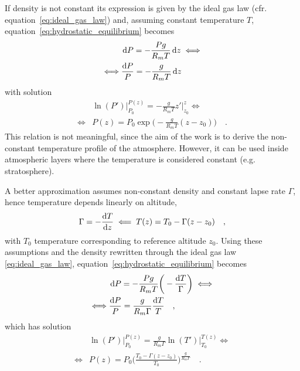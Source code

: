 \documentclass[a4paper,10pt,twocolumn,\classoptions]{article}
\begin{document}
If density is not constant its expression is given by the ideal gas law (cfr. equation~\eqref{eq:ideal_gas_law}) and, assuming constant temperature $T$, equation~\eqref{eq:hydrostatic_equilibrium} becomes
\begin{equation}
  \label{eq:hydrostatic_equilibrium_ideal_gas_law_constant_temperature}
  \begin{split}
    & \odif{P} = - \frac{P g}{R_m T} \odif{z} \iff \\
    \iff & \frac{\odif{P}}{P} = - \frac{g}{R_m T} \odif{z}
  \end{split}
\end{equation}
with solution
\begin{equation}
  \label{eq:pressure_constant_temperature}
  \begin{split}
    & \ln(P') \bigg|_{P_0}^{P(z)} = - \frac{g}{R_m T} z' \bigg|_{z_0}^{z} \iff \\
    \iff & P(z) = P_0 \exp{\bigg( - \frac{g}{R_m T} (z - z_0) \bigg)}
    \quad .
  \end{split}
\end{equation}
This relation is not meaningful, since the aim of the work is to derive the non-constant temperature profile of the atmosphere. However, it can be used inside atmospheric layers where the temperature is considered constant (e.g. stratosphere).

A better approximation assumes non-constant density and constant lapse rate $\Gamma$, hence temperature depends linearly on altitude,
\begin{equation}
  \label{eq:constant_lapse_rate}
  \Gamma = - \frac{\odif{T}}{\odif{z}} \impliedby T(z) = T_0 - \Gamma (z - z_0)
  \quad ,
\end{equation}
with $T_0$ temperature corresponding to reference altitude $z_0$. Using these assumptions and the density rewritten through the ideal gas law \eqref{eq:ideal_gas_law}, equation~\eqref{eq:hydrostatic_equilibrium} becomes
\begin{equation}
  \label{eq:hydrostatic_equilibrium_ideal_gas_law_constant_lapse_rate}
  \begin{split}
    & \odif{P} = - \frac{P g}{R_m T} \bigg( - \frac{\odif{T}}{\Gamma} \bigg) \iff \\
    \iff & \frac{\odif{P}}{P} = \frac{g}{R_m \Gamma} \frac{\odif{T}}{T}
    \quad ,
  \end{split}
\end{equation}
which has solution
\begin{equation}
  \label{eq:pressure_constant_lapse_rate}
  \begin{split}
    & \ln(P') \bigg|_{P_0}^{P(z)} = \frac{g}{R_m \Gamma} \ln(T') \bigg|_{T_0}^{T(z)} \iff \\
    \iff & P(z) = P_0 \bigg( \frac{T_0 - \Gamma (z - z_0)}{T_0} \bigg)^\frac{g}{R_m \Gamma}
    \quad .
  \end{split}
\end{equation}
\end{document}
